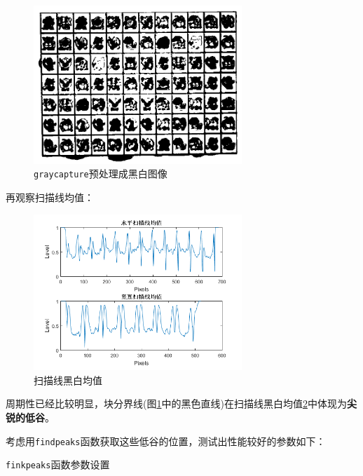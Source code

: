 \documentclass{article}
\numberwithin{figure}{section}
\numberwithin{table}{section}
\numberwithin{listing}{section}
\numberwithin{equation}{section}
\begin{document}
\begin{enumerate}
                \begin{figure}[H]
                    \centering
                    \includegraphics[width=0.7\textwidth]{graycapture_bw}
                    \caption{\texttt{graycapture}预处理成黑白图像}
                    \label{fig:graycapture_bw}
                \end{figure}

                再观察扫描线均值：

                \begin{figure}[H]
                    \centering
                    \includegraphics[width=0.7\textwidth]{bw_mean}
                    \caption{扫描线黑白均值}
                    \label{fig:bw_mean}
                \end{figure}

                周期性已经比较明显，块分界线(图\ref{fig:graycapture_bw}中的黑色直线)在扫描线黑白均值\ref{fig:bw_mean}中体现为\textbf{尖锐的低谷}。

                考虑用\texttt{findpeaks}函数获取这些低谷的位置，测试出性能较好的参数如下：

                \begin{table}[H]
                    \caption{\texttt{finkpeaks}函数参数设置}
                    \centering
                

\end{table}
\end{enumerate}
\end{document}
